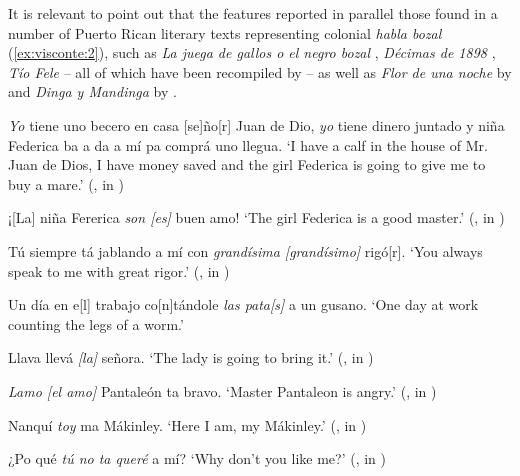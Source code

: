 \documentclass[output=paper,colorlinks,citecolor=brown]{langscibook}
\begin{document}
It is relevant to point out that the features reported in  parallel those found in a number of Puerto Rican literary texts representing colonial \textit{habla bozal} (\ref{ex:visconte:2}), such as \textit{La juega de gallos o el negro bozal} \citep{Caballero1852}, \textit{Décimas de 1898} \citep{Mason1918}, \textit{Tío Fele} \citep{Derkes1883} – all of which have been recompiled by \citet{AlvarezNazario1974} – as well as \textit{Flor de una noche} by \citet{Escalona1883} and \textit{Dinga y Mandinga} by \citet{Vizcarrondo1983}.

\ea\label{ex:visconte:2}
\ea \label{ex:visconte:2a}
  \textit{{Yo} }{tiene uno becero en casa [se]ño[r] Juan de Dio,} \textit{{yo} }{tiene   dinero juntado y niña Federica ba a da a mí pa comprá uno   llegua.}
\glt `I have a calf in the house of Mr. Juan de Dios, I have money   saved and the girl Federica is going to give me to buy a mare.’   (\citealt{Caballero1852}, in \citealt[384]{AlvarezNazario1974})

\ex \label{ex:visconte:2b}
{¡[La] niña Fererica} \textit{{son} \textit{[es]}} {buen amo!}
\glt`The girl Federica is a good master.’ (\citealt{Caballero1852}, in            \citealt[384]{AlvarezNazario1974})

\ex \label{ex:visconte:2c}
{Tú siempre tá jablando a mí con} \textit{{grandísima} \textit{[grandísimo]}} {rigó[r].}
\glt `You always speak to me with great rigor.’ (\citealt{Caballero1852},   in \citealt[384]{AlvarezNazario1974})

\ex \label{ex:visconte:2d}
{Un día en e[l] trabajo co[n]tándole} \textit{{las} \textit{pata[s]}} {a un gusano.}
\glt `One day at work counting the legs of a worm.’ \citep[77]{Escalona1883}

\ex \label{ex:visconte:2e}
 {Llava llevá} \textit{{[la]}} {señora.}
\glt `The lady is going to bring it.’ (\citealt{Derkes1883}, in \citealt[390]{AlvarezNazario1974})

\ex \label{ex:visconte:2f}
 \textit{{Lamo} \textit{[el} \textit{amo]}} {Pantaleón ta bravo.}
\glt `Master Pantaleon is angry.’ (\citealt{Caballero1852}, in \citealt[385]{AlvarezNazario1974})

\ex \label{ex:visconte:2g} 
{Nanquí} \textit{{toy}} {ma Mákinley.}
\glt `Here I am, my Mákinley.’ (\citealt{Mason1918}, in \citealt[396]{AlvarezNazario1974})

\ex \label{ex:visconte:2h}
{¿Po qué} \textit{{tú} \textit{no} \textit{ta} \textit{queré}} {a mí?}
\glt `Why don’t you like me?’ (\citealt{Caballero1852}, in \citealt[384]{AlvarezNazario1974})
\end{document}
